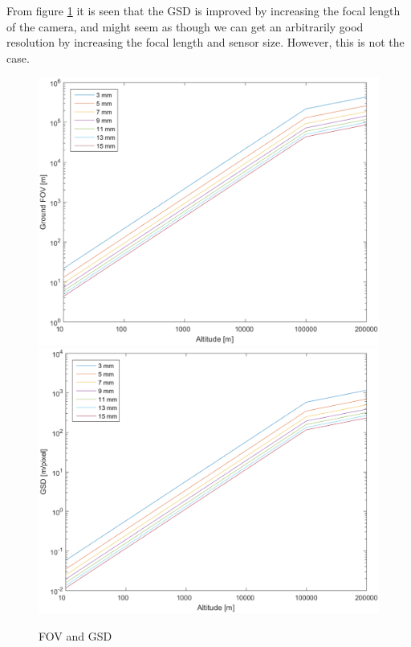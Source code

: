 From figure \ref{cameramatlab} it is seen that the GSD is improved by increasing the focal length of the camera, and might seem as though we can get an arbitrarily good resolution by increasing the focal length and sensor size. However, this is not the case. 
\begin{figure}
\begin{center}
\includegraphics[width=\textwidth]{figures/FOV.eps} 
\includegraphics[width=\textwidth]{figures/GSD.eps}
\caption{FOV and GSD}
\label{cameramatlab}
\end{center}
\end{figure}

